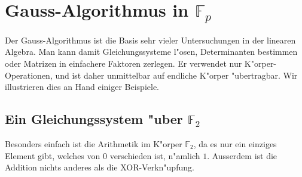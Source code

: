 %
%
%
\section{Gauss-Algorithmus in $\mathbb F_p$}
Der Gauss-Algorithmus ist die Basis sehr vieler Untersuchungen in der
linearen Algebra.
Man kann damit Gleichungssysteme l"osen, Determinanten bestimmen oder
Matrizen in einfachere Faktoren zerlegen.
Er verwendet nur K"orper-Operationen, und ist daher unmittelbar
auf endliche K"orper "ubertragbar.
Wir illustrieren dies an Hand einiger Beispiele.

\subsection{Ein Gleichungssystem "uber $\mathbb F_2$}
Besonders einfach ist die Arithmetik im K"orper $\mathbb F_2$,
da es nur ein einziges Element gibt, welches von $0$ verschieden ist,
n"amlich $1$.
Ausserdem ist die Addition nichts anderes als die XOR-Verkn"upfung.


